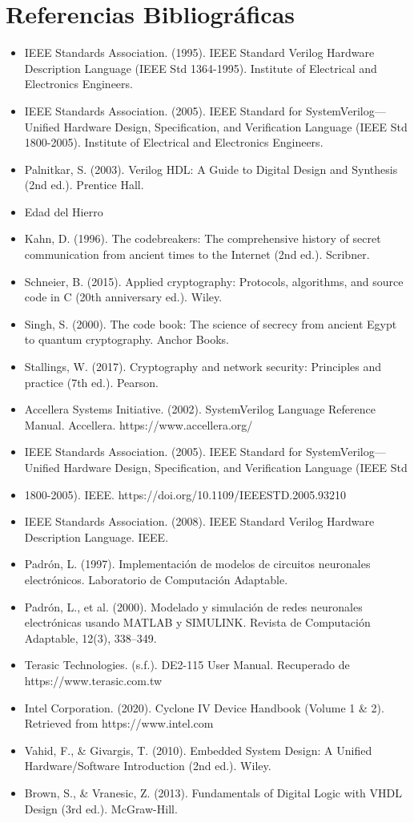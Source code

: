 \chapter{Referencias Bibliográficas}
\begin{itemize}
\item IEEE Standards Association. (1995). IEEE Standard Verilog Hardware Description Language (IEEE Std 1364-1995). Institute of Electrical and Electronics Engineers.
\item IEEE Standards Association. (2005). IEEE Standard for SystemVerilog—Unified Hardware Design, Specification, and Verification Language (IEEE Std 1800-2005). Institute of Electrical and Electronics Engineers.
\item Palnitkar, S. (2003). Verilog HDL: A Guide to Digital Design and Synthesis (2nd ed.). Prentice Hall.
\item Edad del Hierro
\item Kahn, D. (1996). The codebreakers: The comprehensive history of secret communication from ancient times to the Internet (2nd ed.). Scribner.
\item Schneier, B. (2015). Applied cryptography: Protocols, algorithms, and source code in C (20th anniversary ed.). Wiley.
\item Singh, S. (2000). The code book: The science of secrecy from ancient Egypt to quantum cryptography. Anchor Books.
\item Stallings, W. (2017). Cryptography and network security: Principles and practice (7th ed.). Pearson.
\item	Accellera Systems Initiative. (2002). SystemVerilog Language Reference Manual. Accellera. https://www.accellera.org/
\item IEEE Standards Association. (2005). IEEE Standard for SystemVerilog—Unified Hardware Design, Specification, and Verification Language (IEEE Std 
\item 1800-2005). IEEE. https://doi.org/10.1109/IEEESTD.2005.93210
\item IEEE Standards Association. (2008). IEEE Standard Verilog Hardware Description Language. IEEE.
\item Padrón, L. (1997). Implementación de modelos de circuitos neuronales electrónicos. Laboratorio de Computación Adaptable.
\item Padrón, L., et al. (2000). Modelado y simulación de redes neuronales electrónicas usando MATLAB y SIMULINK. Revista de Computación Adaptable, 12(3), 338–349.
\item Terasic Technologies. (s.f.). DE2-115 User Manual. Recuperado de https://www.terasic.com.tw
\item Intel Corporation. (2020). Cyclone IV Device Handbook (Volume 1 \& 2). Retrieved from https://www.intel.com
\item Vahid, F., \& Givargis, T. (2010). Embedded System Design: A Unified Hardware/Software Introduction (2nd ed.). Wiley.
\item Brown, S., \& Vranesic, Z. (2013). Fundamentals of Digital Logic with VHDL Design (3rd ed.). McGraw-Hill.

\end{itemize}
















\endinput 

